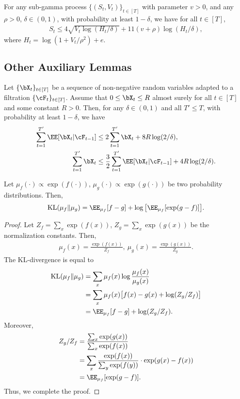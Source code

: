 \documentclass[11pt]{article}
\newcommand{\KL}{\text{KL}}
\begin{document}
\begin{lemma}
\label{lem:bakhtiari10}
    For any sub-gamma process $\{(S_t,V_t)\}_{t \in [T]}$ with parameter $v > 0$, and any $\rho > 0$, $\delta \in (0,1)$, with probability at least $1-\delta$, we have for all $t \in [T]$,
    \begin{align*}
        S_t \le 4\sqrt{V_t\log(H_t/\delta)} + 11 (v+\rho) \log(H_t/\delta),
    \end{align*}
    where $H_t = \log(1+V_t/\rho^2) + e$.
\end{lemma}
\subsection{Other Auxiliary Lemmas}
\begin{lemma}\label{lem:foster}
    Let $\{\bX_t\}_{t \in [T]}$ be a sequence of non-negative random variables adapted to a filtration $\{\cF_t\}_{t \in [T]}$. Assume that $0 \le \bX_t \le R$ almost surely for all $t \in [T]$ and some constant $R > 0$. Then, for any $\delta \in (0,1)$ and all $T' \le T$, with probability at least $1-\delta$, we have
    \begin{align*}
        \sum_{t=1}^{T'} \EE[\bX_t | \cF_{t-1}] &\le 2\sum_{t=1}^{T'} \bX_t + 8R\log(2/\delta),\\
        \sum_{t=1}^{T'} \bX_t &\le \frac{3}{2}\sum_{t=1}^{T'} \EE[\bX_t | \cF_{t-1}] + 4R\log(2/\delta).
    \end{align*}
    
\end{lemma}
\begin{lemma}
\label{lem:KL}
    Let $\mu_f(\cdot) \propto \exp(f(\cdot))$, $\mu_g (\cdot)\propto \exp(g(\cdot))$ be two probability distributions. Then,
    \begin{align*}
        \KL(\mu_f\|\mu_g) = \EE_{\mu_f} [f-g] + \log \big[\EE_{\mu_f}[\exp(g-f)]\big].
    \end{align*}
\end{lemma}
\begin{proof}
    Let $Z_f = \sum_x \exp(f(x))$, $Z_g = \sum_x \exp(g(x))$ be the normalization constants. Then,
    \begin{align*}
        \mu_f(x) = \frac{\exp(f(x))}{Z_f}, \ \mu_g(x) = \frac{\exp(g(x))}{Z_g}.
    \end{align*}
    The KL-divergence is equal to 
    \begin{align*}
        \KL(\mu_f\|\mu_g) &= \sum_x \mu_f(x) \log \frac{\mu_f(x)}{\mu_g(x)}\\
        &= \sum_x \mu_f(x) \big[f(x)-g(x) + \log(Z_g/Z_f)\big]\\
        &= \EE_{\mu_f}[f-g] + \log(Z_g/Z_f).
    \end{align*}
    Moreover,
    \begin{align*}
        Z_g/Z_f &= \frac{\sum_x \exp(g(x))}{\sum_x \exp(f(x))}\\
        &= \sum_x \frac{\exp(f(x))}{\sum_y \exp(f(y))} \cdot \exp(g(x)-f(x))\\
        &= \EE_{\mu_f}[\exp(g-f)].
    \end{align*}
    Thus, we complete the proof.
\end{proof}
\end{document}
